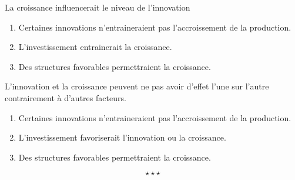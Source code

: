 \begin{enumerate}[label=\Alph*.]
\begin{enumerate}[label=\theenumi\arabic* -]
	\end{enumerate}
	{\bfseries \item La croissance influencerait le niveau de l'innovation}
	\begin{enumerate}[label=\theenumi\arabic* -]
		\item {Certaines innovations n'entraineraient pas l'accroissement de la production.}%
		\item {L'investissement entrainerait la croissance.}%
		\item {Des structures favorables permettraient la croissance.}%
	\end{enumerate} 
	{\bfseries \item L'innovation et la croissance peuvent ne pas avoir d'effet l'une sur l'autre  contrairement à d'autres facteurs.}
	\begin{enumerate}[label=\theenumi\arabic* -]
		\item {Certaines innovations n'entraineraient pas l'accroissement de la production.}%
		\item {L'investissement favoriserait l'innovation ou la croissance.}%
		\item {Des structures favorables permettraient la croissance.}%
	\end{enumerate}
\end{enumerate}
$$\star \star \star$$

